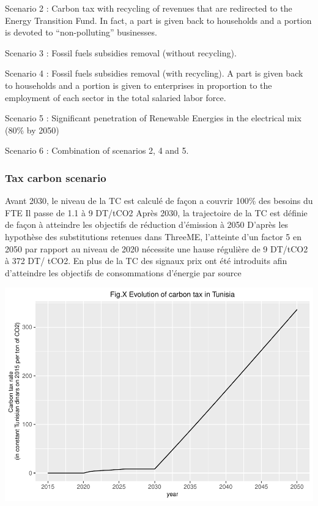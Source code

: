 \documentclass[
]{article}
\begin{document}
Scenario 2 : Carbon tax with recycling of revenues that are redirected
to the Energy Transition Fund. In fact, a part is given back to
households and a portion is devoted to ``non-polluting'' businesses.

Scenario 3 : Fossil fuels subsidies removal (without recycling).

Scenario 4 : Fossil fuels subsidies removal (with recycling). A part is
given back to households and a portion is given to enterprises in
proportion to the employment of each sector in the total salaried labor
force.

Scenario 5 : Significant penetration of Renewable Energies in the
electrical mix (80\% by 2050)

Scenario 6 : Combination of scenarios 2, 4 and 5.

\hypertarget{tax-carbon-scenario}{%
\subsubsection{Tax carbon scenario}\label{tax-carbon-scenario}}

Avant 2030, le niveau de la TC est calculé de façon a couvrir 100\% des
besoins du FTE Il passe de 1.1 à 9 DT/tCO2 Après 2030, la trajectoire de
la TC est définie de façon à atteindre les objectifs de réduction
d'émission à 2050 D'après les hypothèse des substitutions retenues dans
ThreeME, l'atteinte d'un factor 5 en 2050 par rapport au niveau de 2020
nécessite une hause régulière de 9 DT/tCO2 à 372 DT/ tCO2. En plus de la
TC des signaux prix ont été introduits afin d'atteindre les objectifs de
consommations d'énergie par source

\begin{center}\includegraphics[width=0.7\linewidth,height=0.7\textheight]{Modele-ThreeMe-Tunisie_Sequeira_Valilou_Wang_files/figure-latex/unnamed-chunk-6-1} \end{center}
\end{document}
